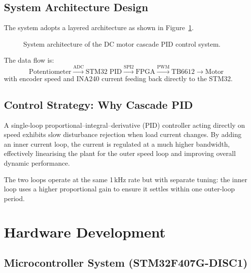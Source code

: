 \documentclass[12pt, a4paper]{report}
\begin{document}
\section{System Architecture Design}

The system adopts a layered architecture as shown in Figure~\ref{fig:arch}.

\begin{figure}[H]
    \centering
    \caption{System architecture of the DC motor cascade PID control system.}
    \label{fig:arch}
\end{figure}

The data flow is:
\[
\text{Potentiometer} \xrightarrow{\text{ADC}} \text{STM32 PID}
\xrightarrow{\text{SPI2}} \text{FPGA} \xrightarrow{\text{PWM}}
\text{TB6612} \rightarrow \text{Motor}
\]
with encoder speed and INA240 current feeding back directly to the STM32.

\section{Control Strategy: Why Cascade PID}

A single-loop proportional--integral--derivative (PID) controller acting
directly on speed exhibits slow disturbance rejection when load current
changes. By adding an inner current loop, the current is regulated at a much
higher bandwidth, effectively linearising the plant for the outer speed loop
and improving overall dynamic performance.

The two loops operate at the same 1\,kHz rate but with separate tuning:
the inner loop uses a higher proportional gain to ensure it settles within
one outer-loop period.

\chapter{Hardware Development}

\section{Microcontroller System (STM32F407G-DISC1)}
\end{document}
